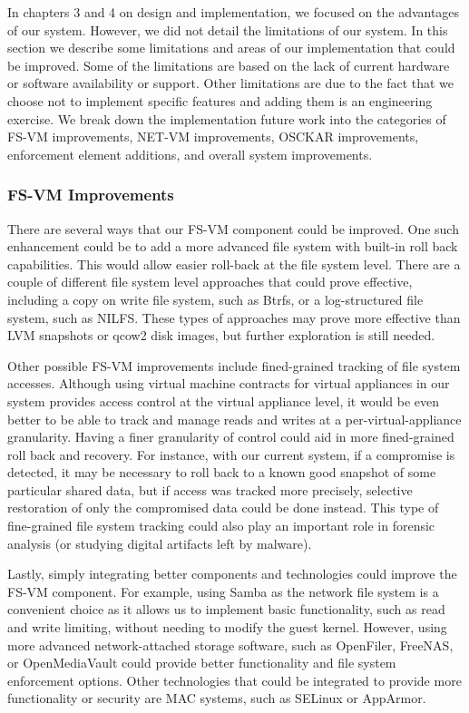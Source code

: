 In chapters 3 and 4 on design and implementation, we focused on the advantages of our system. However, we did not detail the limitations of our system. In this section we describe some limitations and areas of our implementation that could be improved. Some of the limitations are based on the lack of current hardware or software availability or support. Other limitations are due to the fact that we choose not to implement specific features and adding them is an engineering exercise. We break down the implementation future work into the categories of FS-VM improvements, NET-VM improvements, OSCKAR improvements, enforcement element additions, and overall system improvements.

\subsubsection{FS-VM Improvements}

There are several ways that our FS-VM component could be improved. One such enhancement could be to add a more advanced file system with built-in roll back capabilities. This would allow easier roll-back at the file system level. There are a couple of different file system level approaches that could prove effective, including a copy on write file system, such as Btrfs\cite{btrfs_website}, or a log-structured file system, such as NILFS\cite{nilfs_website}. These types of approaches may prove more effective than LVM snapshots or qcow2 disk images, but further exploration is still needed.

Other possible FS-VM improvements include fined-grained tracking of file system accesses. Although using virtual machine contracts for virtual appliances in our system provides access control at the virtual appliance level, it would be even better to be able to track and manage reads and writes at a per-virtual-appliance granularity. Having a finer granularity of control could aid in more fined-grained roll back and recovery. For instance, with our current system, if a compromise is detected, it may be necessary to roll back to a known good snapshot of some particular shared data, but if access was tracked more precisely, selective restoration of only the compromised data could be done instead. This type of fine-grained file system tracking could also play an important role in forensic analysis (or studying digital artifacts left by malware).

Lastly, simply integrating better components and technologies could improve the FS-VM component. For example, using Samba as the network file system is a convenient choice as it allows us to implement basic functionality, such as read and write limiting, without needing to modify the guest kernel. However, using more advanced network-attached storage software, such as OpenFiler\cite{openfiler_website}, FreeNAS\cite{freenas_website}, or OpenMediaVault\cite{openmediavault_website} could provide better functionality and file system enforcement options. Other technologies that could be integrated to provide more functionality or security are MAC systems, such as SELinux or AppArmor.

